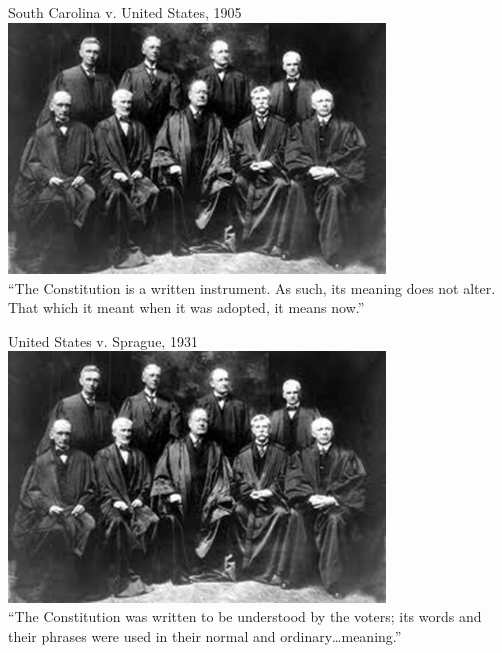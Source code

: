 \begin{frame}{South Carolina v. United States, 1905}
    \centering
    \includegraphics[width=0.75\textwidth]{img/sc-1905.png} \\
    ``The Constitution is a written instrument. As such, its meaning does not alter. That which it meant when it was adopted, it means now.'' \\
\end{frame}

\begin{frame}{United States v. Sprague, 1931}
    \centering
    \includegraphics[width=0.75\textwidth]{img/sc-1905.png} \\
    ``The Constitution was written to be understood by the voters; its words and their phrases were used in their normal and ordinary\ldots meaning.'' \\
\end{frame}


